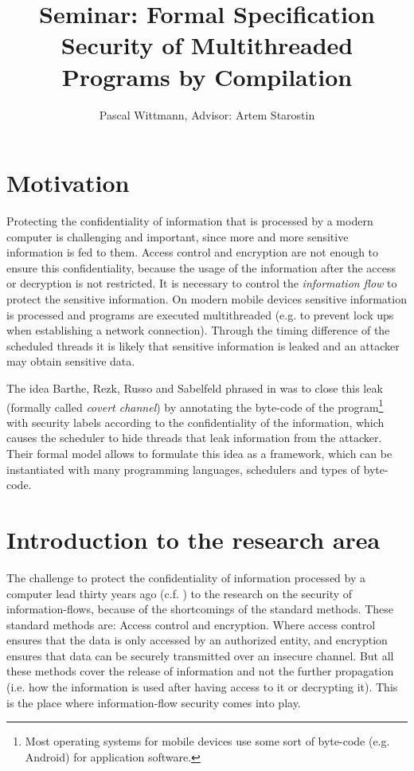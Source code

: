 \documentclass[a4paper,10pt]{llncs}
\begin{document}
\title{{\normalsize Seminar: Formal Specification} \\[1ex]
  Security of Multithreaded Programs by Compilation}
\author{Pascal Wittmann, Advisor: Artem Starostin}

\maketitle


\section{Motivation}
\label{sec:motivation}
Protecting the confidentiality of information that is processed by
a modern computer is challenging and important, since more and more sensitive
information is fed to them. Access control and encryption are not enough to
ensure this confidentiality, because the usage of the information after the
access or decryption is not restricted. It is necessary to control the
\textit{information flow} to protect the sensitive information.
On modern mobile devices sensitive information is processed and programs
are executed multithreaded (e.g. to prevent lock ups when establishing
a network connection). Through the timing difference of the scheduled threads it
is likely that sensitive information is leaked and an attacker may obtain
sensitive data.

The idea Barthe, Rezk, Russo and Sabelfeld phrased in \cite{Barthe07} was to close
this leak (formally called \textit{covert channel}) by annotating the byte-code
of the program\footnote{Most operating systems for mobile devices use some sort of byte-code (e.g. Android) for application software.} with security
labels according to the confidentiality of the information, which causes the scheduler to hide
threads that leak information from the attacker. Their formal model allows to
formulate this idea as a framework, which can be instantiated with many programming languages,
schedulers and types of byte-code.

\section{Introduction to the research area}
\label{sec:introduction}
The challenge to protect the confidentiality of information processed by
a computer lead thirty years ago (c.f. \cite{Zdancewic04}) to the research
on the security of information-flows, because of the shortcomings of the standard methods.
These standard methods are: Access control and encryption. Where
access control ensures that the data is only accessed by an authorized entity,
and encryption ensures that data can be securely transmitted over an insecure channel.
But all these methods cover the release of information and not the further
propagation (i.e. how the information is used after having access to it or decrypting
it). This is the place where information-flow security comes into play.
\end{document}
